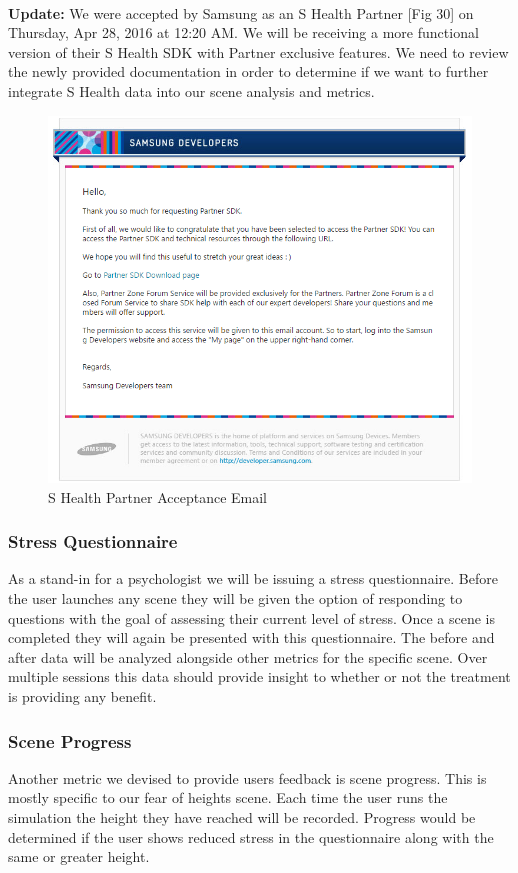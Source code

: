 \documentclass[a4paper,10pt]{article}
\begin{document}
\par~\\
\textbf{Update:}
We were accepted by Samsung as an S Health Partner [Fig 30] on Thursday, Apr 28, 2016 at 12:20 AM. We will be receiving a more functional version of their S Health SDK with Partner exclusive features. We need to review the newly provided documentation in order to determine if we want to further integrate S Health data into our scene analysis and metrics.
\begin{figure}[H] %
	\centerline {\includegraphics[scale = 0.65]{sHealthPartner.png}}
	\caption{S Health Partner Acceptance Email}
	\label{fig:sHealthPartner}
\end{figure}


\subsubsection{Stress Questionnaire}
As a stand-in for a psychologist we will be issuing a stress questionnaire. Before the user launches any scene they will be given the option of responding to questions with the goal of assessing their current level of stress. Once a scene is completed they will again be presented with this questionnaire. The before and after data will be analyzed alongside other metrics for the specific scene. Over multiple sessions this data should provide insight to whether or not the treatment is providing any benefit.

\subsubsection{Scene Progress}
Another metric we devised to provide users feedback is scene progress. This is mostly specific to our fear of heights scene. Each time the user runs the simulation the height they have reached will be recorded. Progress would be determined if the user shows reduced stress in the questionnaire along with the same or greater height.
\end{document}
